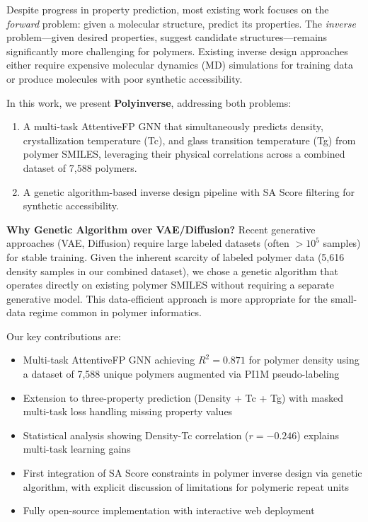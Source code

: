\documentclass{article}
\begin{document}
Despite progress in property prediction, most existing work focuses on the
\textit{forward} problem: given a molecular structure, predict its properties.
The \textit{inverse} problem---given desired properties, suggest candidate
structures---remains significantly more challenging for polymers.
Existing inverse design approaches either require expensive molecular dynamics
(MD) simulations for training data \citep{vitrimer_inverse_2023} or produce
molecules with poor synthetic accessibility.

In this work, we present \textbf{Polyinverse}, addressing both problems:
\begin{enumerate}
    \item A multi-task AttentiveFP GNN that simultaneously predicts density, crystallization
    temperature (Tc), and glass transition temperature (Tg) from polymer SMILES,
    leveraging their physical correlations across a combined dataset of 7,588 polymers.
    \item A genetic algorithm-based inverse design pipeline with SA Score
    \citep{ertl_sa_score_2009} filtering for synthetic accessibility.
\end{enumerate}

\noindent\textbf{Why Genetic Algorithm over VAE/Diffusion?}
Recent generative approaches (VAE, Diffusion) require large labeled datasets
(often $>10^5$ samples) for stable training. Given the inherent scarcity of
labeled polymer data (5,616 density samples in our combined dataset), we chose a
genetic algorithm that operates directly on existing polymer SMILES without
requiring a separate generative model. This data-efficient approach is more
appropriate for the small-data regime common in polymer informatics.

\noindent Our key contributions are:
\begin{itemize}
    \item Multi-task AttentiveFP GNN achieving $R^2=0.871$ for polymer density
    using a dataset of 7,588 unique polymers augmented via PI1M pseudo-labeling
    \item Extension to three-property prediction (Density + Tc + Tg) with
    masked multi-task loss handling missing property values
    \item Statistical analysis showing Density-Tc correlation ($r=-0.246$)
    explains multi-task learning gains
    \item First integration of SA Score constraints in polymer inverse design
    via genetic algorithm, with explicit discussion of limitations for
    polymeric repeat units
    \item Fully open-source implementation with interactive web deployment
\end{itemize}
\end{document}
